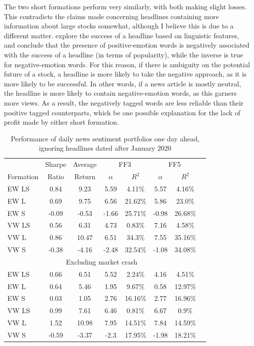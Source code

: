 The two short formations perform very similarly, with both making slight losses. This contradicts the claims made concerning headlines containing more information about large stocks somewhat, although I believe this is due to a different matter. \textcite{linguistic-effect-success} explore the success of a headline based on linguistic features, and conclude that the presence of positive-emotion words is negatively associated with the success of a headline (in terms of popularity), while the inverse is true for negative-emotion words. For this reason, if there is ambiguity on the potential future of a stock, a headline is more likely to take the negative approach, as it is more likely to be successful. In other words, if a news article is mostly neutral, the headline is more likely to contain negative-emotion words, as this garners more views. As a result, the negatively tagged words are less reliable than their positive tagged counterparts, which be one possible explanation for the lack of profit made by either short formation.

\begin{table}[!ht]
\begin{center}
\begin{tabular}{lccccccc}
      \toprule
      & Sharpe &  Average & \multicolumn{2}{c}{FF3} & \multicolumn{2}{c}{FF5} \\
      \cmidrule(lr){4-5}
      \cmidrule(lr){6-7}
      Formation & Ratio & Return & $\alpha$ & $R^2$ & $\alpha$ & $R^2$ \\
      \midrule
      EW LS & 0.84  & 9.23 & 5.59 & 4.11\% & 5.57 & 4.16\% \\
      EW L  & 0.69  & 9.75 & 6.56 & 21.62\% & 5.86 & 23.0\% \\
      EW S  & -0.09 & -0.53 & -1.66 & 25.71\% & -0.98 & 26.68\% \\
      VW LS & 0.56  & 6.31 & 4.73 & 0.83\% & 7.16 & 4.58\% \\
      VW L  & 0.86  & 10.47 & 6.51 & 34.3\% & 7.55 & 35.16\% \\
      VW S  & -0.38 & -4.16 & -2.48 & 32.54\% & -1.08 & 34.08\% \\
      \midrule
      \multicolumn{7}{c}{Excluding market crash} \\
      \midrule
      EW LS & 0.66  & 6.51 & 5.52 & 2.24\% & 4.16 & 4.51\% \\
      EW L  & 0.64  & 5.46 & 1.95 & 9.67\% & 0.58 & 12.97\% \\
      EW S  & 0.03  & 1.05 & 2.76 & 16.16\% & 2.77 & 16.96\% \\
      VW LS & 0.99  & 7.61 & 6.46 & 0.81\% & 6.67 & 0.9\% \\
      VW L  & 1.52  & 10.98 & 7.95 & 14.51\% & 7.84 & 14.59\% \\
      VW S  & -0.59 & -3.37 & -2.3 & 17.95\% & -1.98 & 18.21\% \\
      \bottomrule
\end{tabular}
\caption{Performance of daily news sentiment portfolios one day ahead, ignoring headlines dated after January 2020}
\label{tab:portfolio-performance-no-covid}
\end{center}
\end{table}

